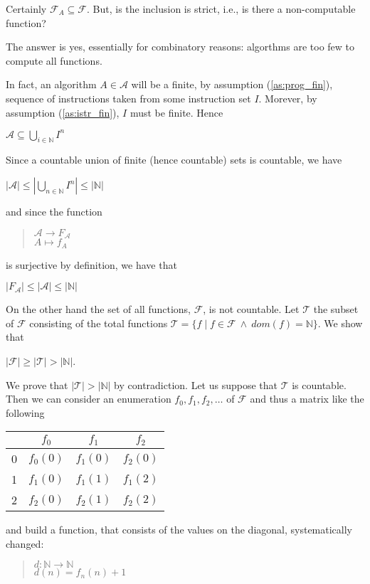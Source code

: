 \documentclass{amsbook}
\newcommand{\nat}{\ensuremath{\mathbb{N}}}
\newcommand{\dom}[1]{\ensuremath{\mathit{dom}({#1})}}
\theoremstyle{definition}
\theoremstyle{remark}
\numberwithin{section}{chapter}
\numberwithin{equation}{chapter}
\begin{document}
Certainly $\mathcal{F}_A \subseteq \mathcal{F}$. But, is the inclusion
is strict, i.e., is there a non-computable function?

The answer is yes, essentially for combinatory reasons: algorthms are
too few to compute all functions.


In fact, an algorithm $A \in \mathcal{A}$ will be a finite, by
assumption (\ref{as:prog_fin}), sequence of instructions taken from
some instruction set $I$. Morever, by assumption (\ref{as:istr_fin}),
$I$ must be finite. Hence
\begin{center}
  $\mathcal{A} \subseteq \bigcup_{i \in \nat} I^n$
\end{center}
Since  a countable union of finite (hence countable) sets is countable, we have
\begin{center}
  $|\mathcal{A}| \leq |\bigcup_{n\in\nat} I^n| \leq |\nat|$
\end{center}
and since the function
\begin{quote}
  $\mathcal{A} \to F_\mathcal{A}$\\
  $A \mapsto f_A$
\end{quote}
is surjective by definition, we have that
\begin{center}
  $|F_\mathcal{A}| \leq |\mathcal{A}| \leq |\nat|$
\end{center}

On the other hand the set of all functions, $\mathcal{F}$, is not countable. Let $\mathcal{T}$ the subset of $\mathcal{F}$ consisting of the total functions $\mathcal{T} = \{ f \mid f \in \mathcal{F}\ \land\ \dom{f} = \nat\}$. We show that
\begin{center}
  $|\mathcal{F}| \geq |\mathcal{T}| > |\nat|$.
\end{center}

We prove that $|\mathcal{T}| > |\nat|$ by contradiction. Let us suppose that $\mathcal{T}$ is countable. Then we can consider an enumeration $f_0, f_1, f_2, \ldots$ of $\mathcal{F}$ and thus a matrix like the following
\begin{center}
  \begin{tabular}{c|ccc}
    & $f_0$    & $f_1$    & $f_2$\\ 
    \hline
    0 & $f_0(0)$ & $f_1(0)$ & $f_2(0)$ \\
    1 & $f_1(0)$ & $f_1(1)$ & $f_1(2)$ \\
    2 & $f_2(0)$ & $f_2(1)$ & $f_2(2)$
  \end{tabular}
\end{center}
and build a function, that consists of the values on the diagonal, systematically changed:
\begin{quote}
  $d: \nat \to \nat$\\  
  $d(n) = f_n(n)+1$
\end{quote}
\end{document}
